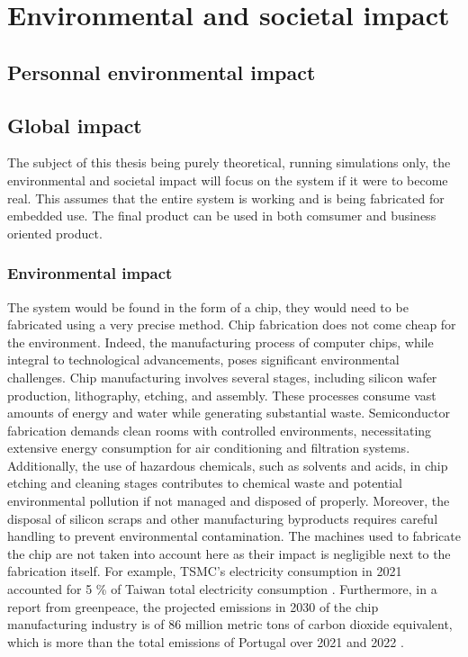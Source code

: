 \section{Environmental and societal impact}

\subsection{Personnal environmental impact}

\subsection{Global impact}

The subject of this thesis being purely theoretical, running simulations only, the environmental and societal impact will focus on the system if it were to become real. This assumes that the entire system is working and is being fabricated for embedded use. The final product can be used in both comsumer and business oriented product.

\subsubsection{Environmental impact}

The system would be found in the form of a chip, they would need to be fabricated using a very precise method. Chip fabrication does not come cheap for the environment. Indeed, the manufacturing process of computer chips, while integral to technological advancements, poses significant environmental challenges. Chip manufacturing involves several stages, including silicon wafer production, lithography, etching, and assembly. These processes consume vast amounts of energy and water while generating substantial waste. Semiconductor fabrication demands clean rooms with controlled environments, necessitating extensive energy consumption for air conditioning and filtration systems. Additionally, the use of hazardous chemicals, such as solvents and acids, in chip etching and cleaning stages contributes to chemical waste and potential environmental pollution if not managed and disposed of properly. Moreover, the disposal of silicon scraps and other manufacturing byproducts requires careful handling to prevent environmental contamination. The machines used to fabricate the chip are not taken into account here as their impact is negligible next to the fabrication itself. For example, TSMC's electricity consumption in 2021 accounted for 5 \% of Taiwan total electricity consumption \cite{chipEnv}. Furthermore, in a report from greenpeace, the projected emissions in 2030 of the chip manufacturing industry is of 86 million metric tons of carbon dioxide equivalent, which is more than the total emissions of Portugal over 2021 and 2022 \cite{greenReport,worldEmissions}.

